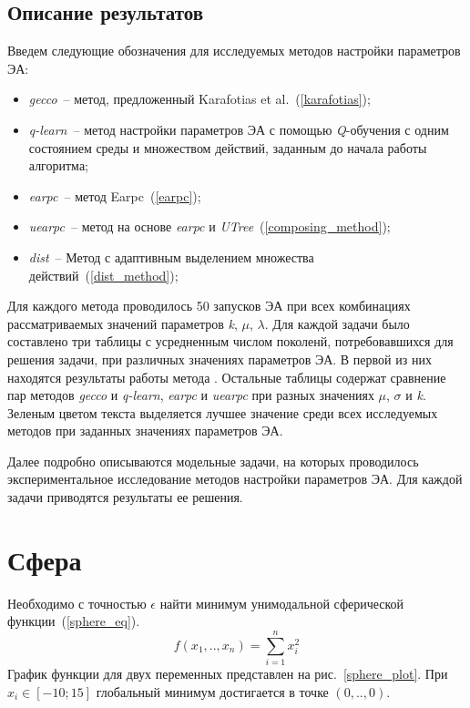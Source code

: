 \subsection{Описание результатов}

Введем следующие обозначения для исследуемых методов настройки параметров ЭА:
\begin{itemize}
 \item \textit{gecco}~-- метод, предложенный Karafotias et al.~(\ref{karafotias});
 \item \textit{q-learn}~-- метод настройки параметров ЭА с помощью \textit{Q}-обучения с одним состоянием среды и множеством действий, заданным до начала работы алгоритма;
 \item \textit{earpc}~-- метод Earpc~(\ref{earpc});
 \item \textit{uearpc}~-- метод на основе \textit{earpc} и \textit{UTree}~(\ref{composing_method});
 \item \textit{dist}~-- Метод с адаптивным выделением множества действий~(\ref{dist_method});
\end{itemize}

Для каждого метода проводилось 50 запусков ЭА при всех комбинациях рассматриваемых значений параметров \textit{k}, $\mu$, $\lambda$. Для каждой задачи было составлено три таблицы с усредненным числом поколенй, потребовавшихся для решения задачи, при различных значениях параметров ЭА. В первой из них находятся результаты работы метода . Остальные таблицы содержат сравнение пар методов \textit{gecco} и \textit{q-learn}, \textit{earpc} и \textit{uearpc} при разных значениях $\mu$, $\sigma$ и \textit{k}. Зеленым цветом текста выделяется лучшее значение среди всех исследуемых методов при заданных значениях параметров ЭА.
 
Далее подробно описываются модельные задачи, на которых проводилось экспериментальное исследование методов настройки параметров ЭА. Для каждой задачи приводятся результаты ее решения.
 
\section{Сфера}

Необходимо с точностью $\epsilon$ найти минимум унимодальной сферической функции~(\ref{sphere_eq}).
\begin{equation}
\label{sphere_eq}
f(x_1,..,x_n) = \sum\limits_{i=1}^n{x_i^2}
\end{equation}
График функции для двух переменных представлен на рис.~\ref{sphere_plot}. При $x_i \in [-10; 15]$ глобальный минимум достигается в точке $(0,..,0)$.

